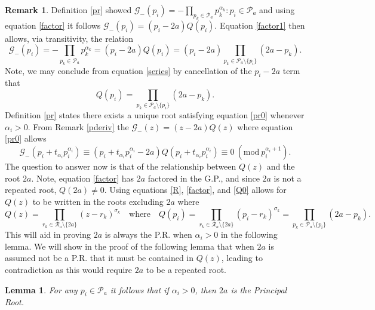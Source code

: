 \documentclass[12pt,a4paper]{amsart}
\numberwithin{equation}{section}
\theoremstyle{theorem}
\theoremstyle{definition}
\newtheorem{lemma}{Lemma}
\newtheorem{remark}{Remark}
\theoremstyle{remark}
\theoremstyle{con}
\newcommand{\Mod}[1]{\ (\mathrm{mod}\ #1)}
\begin{document}
\begin{remark}\label{func}
Definition \ref{pr} showed $\mathcal{G}_-(p_i) = - \prod_{p_k \in \mathcal{P}_a}p_k^{\alpha_k} : p_i \in \mathcal{P}_a$ and using equation \ref{factor} it follows $\mathcal{G}_-(p_i) =  (p_i - 2a)Q(p_i)$. Equation \ref{factor1} then allows, via transitivity, the relation
 \begin{equation}\label{series}
\mathcal{G}_-(p_i) = - \prod_{p_k \in \mathcal{P}_a}p_k^{\alpha_k} = (p_i - 2a)Q(p_i) = (p_i - 2a)\prod_{p_k \in \mathcal{P}_a \setminus \{p_i\}}(2a - p_k). 
\end{equation}
 Note, we may conclude from equation \ref{series} by cancellation of the $p_i - 2a$ term that
 \begin{equation}\label{Q0}
 Q(p_i) = \prod_{p_k \in \mathcal{P}_a \setminus \{p_i\}}(2a - p_k).
 \end{equation}
 Definition \ref{pr} states there exists a unique root satisfying equation \ref{pr0} whenever $\alpha_i > 0$. From Remark \ref{pderiv} the $\mathcal{G}_-(z) = (z-2a)Q(z)$ where equation \ref{pr0} allows 
\begin{equation}\label{series1}
\mathcal{G}_-(p_i + t_{\alpha_i}p_i^{\alpha_i}) \equiv (p_i + t_{\alpha_i}p_i^{\alpha_i}-2a)Q(p_i + t_{\alpha_i}p_i^{\alpha_i}) \equiv 0 \Mod{p_i^{\alpha_i +1}}.
\end{equation}
The question to answer now is that of the relationship between $Q(z)$ and the root $2a$. Note, equation \ref{factor} has $2a$ factored in the G.P., and since $2a$ is not a repeated root, $Q(2a) \neq 0$. Using equations \ref{R}, \ref{factor}, and \ref{Q0} allows for $Q(z)$ to be written in the roots excluding $2a$ where
\begin{equation}\label{Q}
Q(z) = \prod_{r_k \in \mathcal{R}_a \setminus \{2a\}}(z - r_k)^{\sigma_k} \quad \text{where} \quad Q(p_i) = \prod_{r_k \in \mathcal{R}_a \setminus \{2a\}}(p_i - r_k)^{\sigma_k} = \prod_{p_k \in \mathcal{P}_a \setminus \{p_i\}}(2a - p_k).
\end{equation}
This will aid in proving $2a$ is always the P.R. when $\alpha_i > 0$ in the following lemma. We will show in the proof of the following lemma that when $2a$ is assumed not be a P.R. that it must be contained in $Q(z)$, leading to contradiction as this would require $2a$ to be a repeated root. 
\end{remark}

\begin{lemma}\label{perfect}
\textit{For any $p_i \in \mathcal{P}_a$ it follows that if $\alpha_i > 0$, then $2a$ is the Principal Root.}
\end{lemma}
\end{document}
